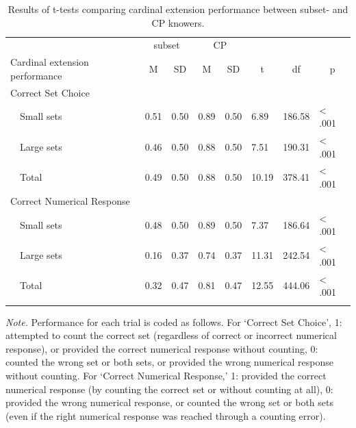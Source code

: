 \documentclass[
  man,floatsintext]{apa7}
\begin{document}
\begin{table}[tbp]

\begin{center}
\begin{threeparttable}

\caption{\label{tab:table1}Results of t-tests comparing cardinal extension performance between subset- and CP knowers.}

\begin{tabular}{llllllll}
\toprule
 & \multicolumn{2}{c}{subset} & \multicolumn{2}{c}{CP}  &  &  &\\
\cmidrule(r){2-3} \cmidrule(r){4-5}
Cardinal extension performance & \multicolumn{1}{c}{M} & \multicolumn{1}{c}{SD} & \multicolumn{1}{c}{M} & \multicolumn{1}{c}{SD} & \multicolumn{1}{c}{t} & \multicolumn{1}{c}{df} & \multicolumn{1}{c}{p}\\
\midrule
Correct Set Choice &  &  &  &  &  &  & \\
\ \ Small sets & 0.51 & 0.50 & 0.89 & 0.50 & 6.89 & 186.58 & < .001\\
\ \ Large sets & 0.46 & 0.50 & 0.88 & 0.50 & 7.51 & 190.31 & < .001\\
\ \ Total & 0.49 & 0.50 & 0.88 & 0.50 & 10.19 & 378.41 & < .001\\
Correct Numerical Response &  &  &  &  &  &  & \\
\ \ Small sets & 0.48 & 0.50 & 0.89 & 0.50 & 7.37 & 186.64 & < .001\\
\ \ Large sets & 0.16 & 0.37 & 0.74 & 0.37 & 11.31 & 242.54 & < .001\\
\ \ Total & 0.32 & 0.47 & 0.81 & 0.47 & 12.55 & 444.06 & < .001\\
\bottomrule
\addlinespace
\end{tabular}

\begin{tablenotes}[para]
\normalsize{\textit{Note.} Performance for each trial is coded as follows. For ‘Correct Set Choice’, 1: attempted to count the correct set (regardless of correct or incorrect numerical response), or provided the correct numerical response without counting, 0: counted the wrong set or both sets, or provided the wrong numerical response without counting. For ‘Correct Numerical Response,’ 1: provided the correct numerical response (by counting the correct set or without counting at all), 0: provided the wrong numerical response, or counted the wrong set or both sets (even if the right numerical response was reached through a counting error).}
\end{tablenotes}

\end{threeparttable}
\end{center}

\end{table}
\end{document}
